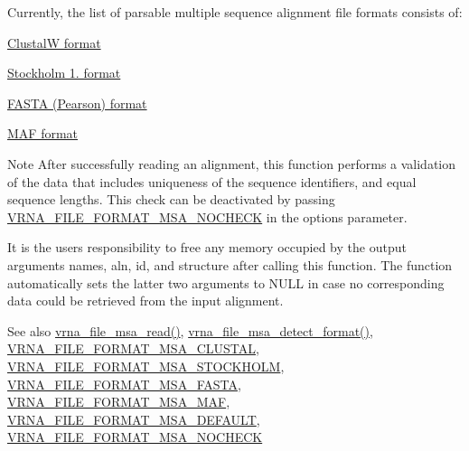 Currently, the list of parsable multiple sequence alignment file formats consists of\+:
\begin{DoxyItemize}
\item \hyperlink{file_formats_msa-formats-clustal}{ClustalW format}
\item \hyperlink{file_formats_msa-formats-stockholm}{Stockholm 1. format}
\item \hyperlink{file_formats_msa-formats-fasta}{F\+A\+S\+TA (Pearson) format}
\item \hyperlink{file_formats_msa-formats-maf}{M\+AF format}
\end{DoxyItemize}\begin{DoxyNote}{Note}
After successfully reading an alignment, this function performs a validation of the data that includes uniqueness of the sequence identifiers, and equal sequence lengths. This check can be deactivated by passing \hyperlink{group__file__utils_ga229fb3778ecabea4782902b69fa48fd1}{V\+R\+N\+A\+\_\+\+F\+I\+L\+E\+\_\+\+F\+O\+R\+M\+A\+T\+\_\+\+M\+S\+A\+\_\+\+N\+O\+C\+H\+E\+CK} in the {\ttfamily options} parameter.

It is the users responsibility to free any memory occupied by the output arguments {\ttfamily names}, {\ttfamily aln}, {\ttfamily id}, and {\ttfamily structure} after calling this function. The function automatically sets the latter two arguments to {\ttfamily N\+U\+LL} in case no corresponding data could be retrieved from the input alignment.
\end{DoxyNote}
\begin{DoxySeeAlso}{See also}
\hyperlink{group__file__utils_ga08a01c40ac5f5e0e04e9ae2258c99aa6}{vrna\+\_\+file\+\_\+msa\+\_\+read()}, \hyperlink{group__file__utils_ga627ac281b5f11c63861726e6472626c9}{vrna\+\_\+file\+\_\+msa\+\_\+detect\+\_\+format()}, \hyperlink{group__file__utils_ga79a23de2c7249f2cccd762e475c81859}{V\+R\+N\+A\+\_\+\+F\+I\+L\+E\+\_\+\+F\+O\+R\+M\+A\+T\+\_\+\+M\+S\+A\+\_\+\+C\+L\+U\+S\+T\+AL}, \hyperlink{group__file__utils_ga62be992445cd8ab2ad7a8fded944338b}{V\+R\+N\+A\+\_\+\+F\+I\+L\+E\+\_\+\+F\+O\+R\+M\+A\+T\+\_\+\+M\+S\+A\+\_\+\+S\+T\+O\+C\+K\+H\+O\+LM}, \hyperlink{group__file__utils_gacf6274a2c825f34e4131404665b00604}{V\+R\+N\+A\+\_\+\+F\+I\+L\+E\+\_\+\+F\+O\+R\+M\+A\+T\+\_\+\+M\+S\+A\+\_\+\+F\+A\+S\+TA}, \hyperlink{group__file__utils_gab3186d774c01570d2a47d0308eec4927}{V\+R\+N\+A\+\_\+\+F\+I\+L\+E\+\_\+\+F\+O\+R\+M\+A\+T\+\_\+\+M\+S\+A\+\_\+\+M\+AF}, \hyperlink{group__file__utils_ga4acc255373831856a8417b68de8a94c0}{V\+R\+N\+A\+\_\+\+F\+I\+L\+E\+\_\+\+F\+O\+R\+M\+A\+T\+\_\+\+M\+S\+A\+\_\+\+D\+E\+F\+A\+U\+LT}, \hyperlink{group__file__utils_ga229fb3778ecabea4782902b69fa48fd1}{V\+R\+N\+A\+\_\+\+F\+I\+L\+E\+\_\+\+F\+O\+R\+M\+A\+T\+\_\+\+M\+S\+A\+\_\+\+N\+O\+C\+H\+E\+CK}
\end{DoxySeeAlso}


